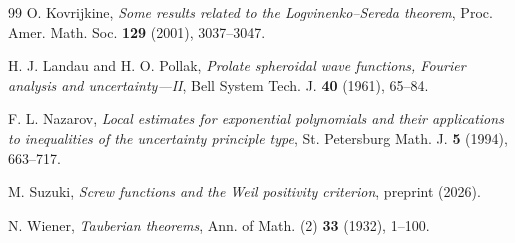 \documentclass[11pt]{article}
\theoremstyle{remark}
\begin{document}
\begin{thebibliography}{99}
O. Kovrijkine,
\emph{Some results related to the Logvinenko--Sereda theorem},
Proc. Amer. Math. Soc. \textbf{129} (2001), 3037--3047.

H. J. Landau and H. O. Pollak,
\emph{Prolate spheroidal wave functions, Fourier analysis and uncertainty---II},
Bell System Tech. J. \textbf{40} (1961), 65--84.

F. L. Nazarov,
\emph{Local estimates for exponential polynomials and their applications to inequalities of the uncertainty principle type},
St. Petersburg Math. J. \textbf{5} (1994), 663--717.

M. Suzuki,
\emph{Screw functions and the Weil positivity criterion},
preprint (2026).

N. Wiener,
\emph{Tauberian theorems},
Ann. of Math. (2) \textbf{33} (1932), 1--100.

\end{thebibliography}
\end{document}
